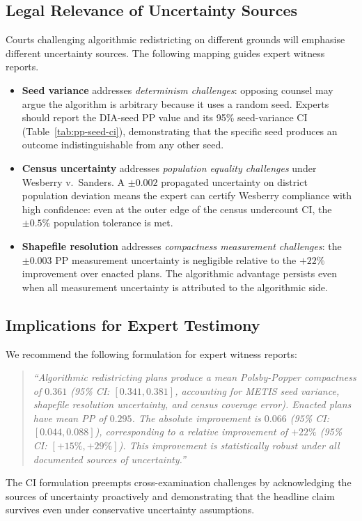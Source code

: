 \subsection{Legal Relevance of Uncertainty Sources}

Courts challenging algorithmic redistricting on different grounds will
emphasise different uncertainty sources. The following mapping guides
expert witness reports.

\begin{itemize}
  \item \textbf{Seed variance} addresses \emph{determinism challenges}:
    opposing counsel may argue the algorithm is arbitrary because it
    uses a random seed. Experts should report the DIA-seed PP value and
    its 95\% seed-variance CI (Table~\ref{tab:pp-seed-ci}), demonstrating
    that the specific seed produces an outcome indistinguishable from any
    other seed.

  \item \textbf{Census uncertainty} addresses \emph{population equality
    challenges} under Wesberry v.\ Sanders. A $\pm 0.002$ propagated
    uncertainty on district population deviation means the expert can
    certify Wesberry compliance with high confidence: even at the outer
    edge of the census undercount CI, the $\pm 0.5\%$ population
    tolerance is met.

  \item \textbf{Shapefile resolution} addresses \emph{compactness
    measurement challenges}: the $\pm 0.003$ PP measurement uncertainty
    is negligible relative to the $+22\%$ improvement over enacted
    plans. The algorithmic advantage persists even when all measurement
    uncertainty is attributed to the algorithmic side.
\end{itemize}

\subsection{Implications for Expert Testimony}

We recommend the following formulation for expert witness reports:

\begin{quote}
\textit{``Algorithmic redistricting plans produce a mean Polsby-Popper
compactness of $0.361$ (95\% CI: $[0.341, 0.381]$, accounting for
METIS seed variance, shapefile resolution uncertainty, and census
coverage error). Enacted plans have mean PP of $0.295$. The absolute
improvement is $0.066$ (95\% CI: $[0.044, 0.088]$), corresponding
to a relative improvement of $+22\%$ (95\% CI: $[+15\%, +29\%]$).
This improvement is statistically robust under all documented sources
of uncertainty.''}
\end{quote}

The CI formulation preempts cross-examination challenges by
acknowledging the sources of uncertainty proactively and demonstrating
that the headline claim survives even under conservative uncertainty
assumptions.
